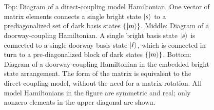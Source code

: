\begin{figure}
  \caption{Top: Diagram of a direct-coupling model Hamiltonian.  One
    vector of matrix elements connects a single bright state $\mathinner{|{s}\rangle}$
    to a prediagonalized set of dark basis states $\lbrace \mathinner{|{m}\rangle}
    \rbrace$.  Middle: Diagram of a doorway-coupling Hamiltonian.  A
    single bright basis state $\mathinner{|{s}\rangle}$ is connected to a single
    doorway basis state $\mathinner{|{\ell}\rangle}$, which is connected in turn to a
    pre-diagonalized block of dark states $\lbrace \mathinner{|{m}\rangle} \rbrace$.
    Bottom: Diagram of a doorway-coupling Hamiltonian in the embedded
    bright state arrangement. The form of the matrix is equivalent to
    the direct-coupling model, without the need for a matrix
    rotation.  All model Hamiltonians in the figure are symmetric and
    real; only nonzero elements in the upper diagonal are shown.}
  \label{fig:matrix}
  \centering
  \\[1cm]
  \\[1cm]
\end{figure}

